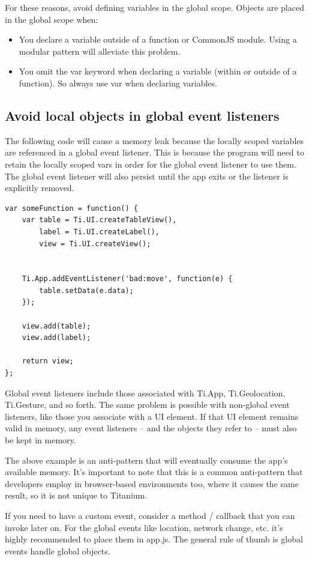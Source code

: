\documentclass[11pt]{book}
\begin{document}
For these reasons, avoid defining variables in the global scope. Objects are placed in the global scope when:
\begin{itemize}
    \item You declare a variable outside of a function or CommonJS module. Using a modular pattern will alleviate this problem.
    \item You omit the var keyword when declaring a variable (within or outside of a function). So always use var when declaring variables.
\end{itemize}

\subsection{Avoid local objects in global event listeners}
The following code will cause a memory leak because the locally scoped variables are referenced in a global event listener. This is because the program will need to retain the locally scoped vars in order for the global event listener to use them. The global event listener will also persist until the app exits or the listener is explicitly removed.

\begin{lstlisting}[frame=single]
var someFunction = function() {
    var table = Ti.UI.createTableView(),
        label = Ti.UI.createLabel(),
        view = Ti.UI.createView();


    Ti.App.addEventListener('bad:move', function(e) {
        table.setData(e.data);
    });

    view.add(table);
    view.add(label);

    return view;
};
\end{lstlisting}

Global event listeners include those associated with Ti.App, Ti.Geolocation, Ti.Gesture, and so forth. The same problem is possible with non-global event listeners, like those you associate with a UI element. If that UI element remains valid in memory, any event listeners – and the objects they refer to – must also be kept in memory.

The above example is an anti-pattern that will eventually consume the app's available memory. It's important to note that this is a common anti-pattern that developers employ in browser-based environments too, where it causes the same result, so it is not unique to Titanium.

If you need to have a custom event, consider a method / callback that you can invoke later on. For the global events like location, network change, etc. it's highly recommended to place them in app.js. The general rule of thumb is global events handle global objects.
\end{document}
